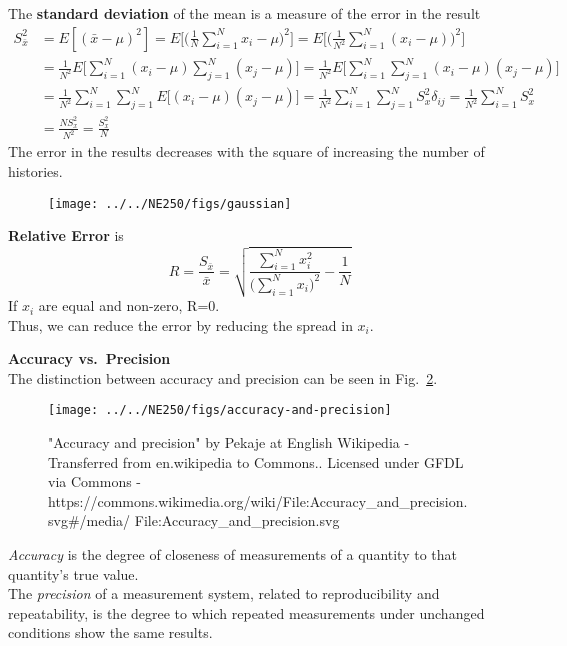 \documentclass[12pt]{article}
\begin{document}
The \textbf{standard deviation} of the mean is a measure of the error in the result
\begin{align*}
S_{\bar{x}}^2 &= E[(\bar{x} - \mu)^2] = E\biggl[ \biggl(\frac{1}{N}\sum_{i=1}^N x_i - \mu\biggr)^2\biggr] = E\biggl[ \biggl(\frac{1}{N^2}\sum_{i=1}^N (x_i - \mu)\biggr)^2\biggr]\\
%
&=\frac{1}{N^2} E\biggl[ \sum_{i=1}^N (x_i - \mu) \sum_{j=1}^N (x_j - \mu)\biggr] = \frac{1}{N^2} E\biggl[ \sum_{i=1}^N \sum_{j=1}^N (x_i - \mu)  (x_j - \mu)\biggr]\\
%
&= \frac{1}{N^2} \sum_{i=1}^N \sum_{j=1}^N E\bigl[  (x_i - \mu)  (x_j - \mu)\bigr] = \frac{1}{N^2} \sum_{i=1}^N \sum_{j=1}^N S^2_x \delta_{ij} = \frac{1}{N^2} \sum_{i=1}^N S_x^2 \\
%
&= \frac{N S_x^2}{N^2} = \boxed{\frac{S_x^2}{N}}
\end{align*}
The error in the results decreases with the square of increasing the number of histories.
%
\begin{figure}[h!]
\begin{center}
  \texttt{[image: ../../NE250/figs/gaussian]}
\end{center}
  \label{fig:gaussian}
\end{figure}

\textbf{Relative Error} is 
\[
R = \frac{S_{\bar{x}}}{\bar{x}} = \sqrt{\frac{\sum_{i=1}^N x_i^2}{\bigl(\sum_{i=1}^N x_i\bigr)^2} - \frac{1}{N}} 
\]
If $x_i$ are equal and non-zero, R=0.\\
Thus, we can reduce the error by reducing the spread in $x_i$.

\textbf{Accuracy vs.\ Precision}\\
The distinction between accuracy and precision can be seen in Fig.~\ref{fig:accuracy}.\\
%
\begin{figure}[h!]
\begin{center}
  \texttt{[image: ../../NE250/figs/accuracy-and-precision]}
\end{center}
  \caption{"Accuracy and precision" by Pekaje at English Wikipedia - Transferred from en.wikipedia to Commons.. Licensed under GFDL via Commons - https://commons.wikimedia.org/wiki/File:Accuracy\_and\_precision.svg\#/media/
  File:Accuracy\_and\_precision.svg}
  \label{fig:accuracy}
\end{figure}
%
\textit{Accuracy} is the degree of closeness of measurements of a quantity to that quantity's true value.\\
The \textit{precision} of a measurement system, related to reproducibility and repeatability, is the degree to which repeated measurements under unchanged conditions show the same results.
\end{document}
